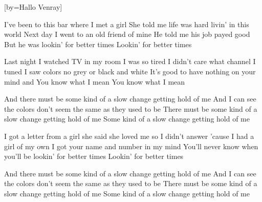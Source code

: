 

[by=Hallo Venray]





\beginverse
I've been to this bar where I met a girl
She told me life was hard livin' in this world
Next day I went to an old friend of mine
He told me his job payed good
But he was lookin' for better times
Lookin' for better times
\endverse

\beginverse
Last night I watched TV in my room
I was so tired I didn't care what channel I tuned
I saw colors no grey or black and white
It's good to have nothing on your mind and
You know what I mean
You know what I mean
\endverse

\beginchorus
And there must be some kind of a slow change getting hold of me
And I can see the colors don't seem the same as they used to be
There must be some kind of a slow change getting hold of me
Some kind of a slow change getting hold of me
\endchorus

\beginverse
I got a letter from a girl she said she loved me so
I didn't answer 'cause I had a girl of my own
I got your name and number in my mind
You'll never know when you'll be
lookin' for better times
Lookin' for better times
\endverse

\beginchorus
And there must be some kind of a slow change getting hold of me
And I can see the colors don't seem the same as they used to be
There must be some kind of a slow change getting hold of me
Some kind of a slow change getting hold of me
\endverse


\endsong
